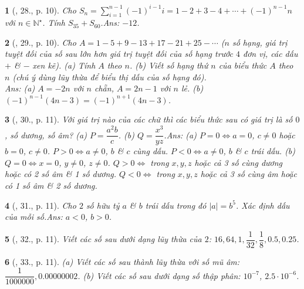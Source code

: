 \documentclass{article}
\newtheorem{baitoan}{}
\begin{document}
\begin{baitoan}[\cite{Binh_Toan_7_tap_1}, 28., p. 10]
	Cho $S_n = \sum_{i=1}^{n-1} (-1)^{i-1}i = 1 - 2 + 3 - 4 + \cdots + (-1)^{n-1}n$ với $n\in\mathbb{N}^\star$. Tính $S_{35} + S_{60}$.\hfill{\sf Ans: $-12$.}
\end{baitoan}

\begin{baitoan}[\cite{Binh_Toan_7_tap_1}, 29., p. 10]
	Cho $A = 1 - 5 + 9 - 13 + 17 - 21 + 25 - \cdots$ ($n$ số hạng, giá trị tuyệt đối của số sau lớn hơn giá trị tuyệt đối của số hạng trước $4$ đơn vị, các dấu $+$ \& $-$ xen kẽ). (a) Tính $A$ theo $n$. (b) Viết số hạng thứ $n$ của biểu thức $A$ theo $n$ (chú ý dùng lũy thừa để biểu thị dấu của số hạng đó).\\\mbox{}\hfill{\sf Ans: (a) $A = -2n$ với $n$ chẵn, $A = 2n - 1$ với $n$ lẻ. (b) $(-1)^{n-1}(4n - 3) = (-1)^{n+1}(4n - 3)$.}
\end{baitoan}

\begin{baitoan}[\cite{Binh_Toan_7_tap_1}, 30., p. 11]
	Với giá trị nào của các chữ thì các biểu thức sau có giá trị là số $0$, số dương, số âm? (a) $P = \dfrac{a^2b}{c}$. (b) $Q = \dfrac{x^3}{yz}$.\hfill{\sf Ans: (a) $P = 0\Leftrightarrow a = 0$, $c\ne 0$ hoặc $b = 0$, $c\ne 0$. $P > 0\Leftrightarrow a\ne 0$, $b$ \& $c$ cùng dấu. $P < 0\Leftrightarrow a\ne 0$, $b$ \& $c$ trái dấu. (b) $Q = 0\Leftrightarrow x = 0$, $y\ne 0$, $z\ne 0$. $Q > 0\Leftrightarrow$ trong $x,y,z$ hoặc cả 3 số cùng dương hoặc có 2 số âm \& 1 số dương. $Q < 0\Leftrightarrow$ trong $x,y,z$ hoặc cả 3 số cùng âm hoặc có 1 số âm \& 2 số dương.}
\end{baitoan}

\begin{baitoan}[\cite{Binh_Toan_7_tap_1}, 31., p. 11]
	Cho $2$ số hữu tỷ $a$ \& $b$ trái dấu trong đó $|a| = b^5$. Xác định dấu của mỗi số.\hfill{\sf Ans: $a < 0$, $b > 0$.}
\end{baitoan}

\begin{baitoan}[\cite{Binh_Toan_7_tap_1}, 32., p. 11]
	Viết các số sau dưới dạng lũy thừa của $2$: $16,64,1,\dfrac{1}{32},\dfrac{1}{8},0.5,0.25$.
\end{baitoan}

\begin{baitoan}[\cite{Binh_Toan_7_tap_1}, 33., p. 11]
	(a) Viết các số sau thành lũy thừa với số mũ âm: $\dfrac{1}{1000000},0.00000002$. (b) Viết các số sau dưới dạng số thập phân: $10^{-7}$, $2.5\cdot 10^{-6}$.
\end{baitoan}
\end{document}
